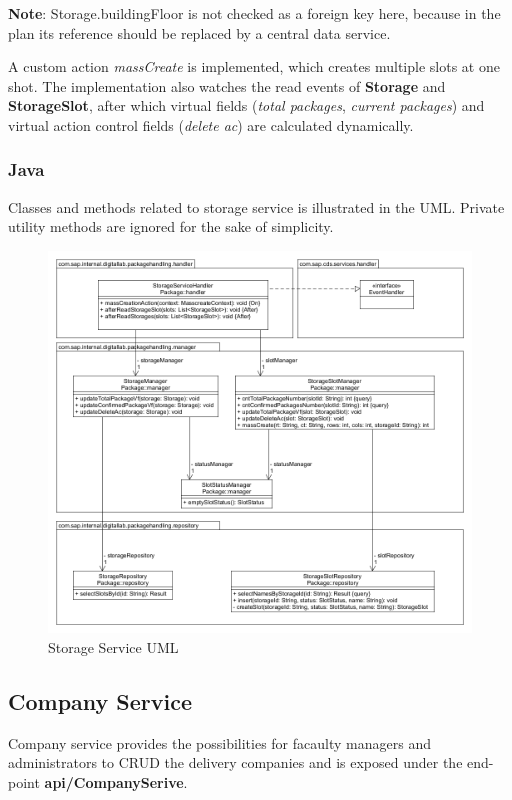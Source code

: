 \bigskip
\textbf{Note}: Storage.buildingFloor is not checked as a foreign key here, because in the plan its reference should be replaced by a central data service.


A custom action \textit{massCreate} is implemented, which creates multiple slots at one shot. The implementation also watches the read events of \textbf{Storage} and \textbf{StorageSlot}, after which virtual fields (\textit{total packages}, \textit{current packages}) and virtual action control fields (\textit{delete ac}) are calculated dynamically.

\subsubsection{Java}

Classes and methods related to storage service is illustrated in the UML. Private utility methods are ignored for the sake of simplicity.
\begin{figure}[!h]
    \centering
    \includegraphics[width=1\linewidth]{images/service_class_diagrams/storage_service_class_diagram.png}
    \caption{Storage Service UML}
    \label{fig:storage_service_uml}
\end{figure}
\pagebreak

\subsection{Company Service}
Company service provides the possibilities for facaulty managers and administrators to CRUD the delivery companies and is exposed under the end-point \textbf{api/CompanySerive}.

